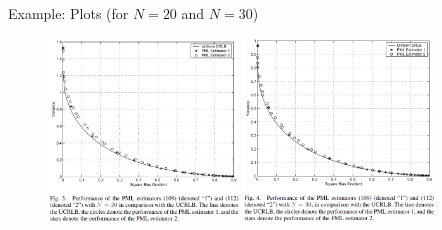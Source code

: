 \documentclass{beamer}
\begin{document}
\begin{frame}{Example: Plots (for $N = 20$ and $N = 30$)}
\begin{figure}
    \centering
    \includegraphics[width=0.45\textwidth]{figures/fig3.png}
    \includegraphics[width=0.45\textwidth]{figures/fig4.png}
\end{figure}
\end{frame}
\end{document}

